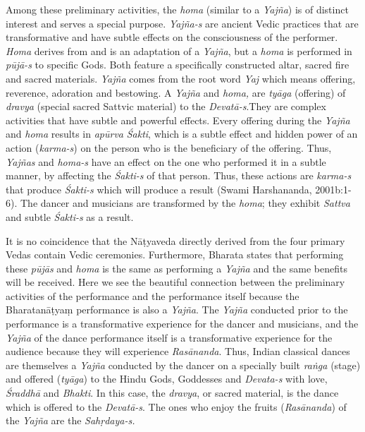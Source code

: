  Among these preliminary activities, the \textit{homa} (similar to a \textit{Yajña}) is of distinct interest and serves a special purpose. \textit{Yajña-s} are ancient Vedic practices that are transformative and have subtle effects on the consciousness of the performer. \textit{Homa} derives from and is an adaptation of a \textit{Yajña}, but a \textit{homa} is performed in \textit{pūjā-s }to specific Gods. Both feature a specifically constructed altar, sacred fire and sacred materials. \textit{Yajña} comes from the root word \textit{Yaj} which means offering, reverence, adoration and bestowing. A \textit{Yajña} and \textit{homa,} are \textit{tyāga }(offering) of \textit{dravya} (special sacred Sattvic material) to the \textit{Devatā-s}.\break They are complex activities that have subtle and powerful effects. Every offering during the \textit{Yajña} and \textit{homa} results in \textit{apūrva} \textit{Śakti}, which is a subtle effect and hidden power of an action (\textit{karma-s}) on the person who is the beneficiary of the offering. Thus, \textit{Yajñas} and \textit{homa-s} have an effect on the one who performed it in a subtle manner, by affecting the \textit{Śakti-s }of that person. Thus, these actions are \textit{karma-s} that produce \textit{Śakti-s} which will produce a result (Swami Harshananda, 2001b:1-6). The dancer and musicians are transformed by the \textit{homa}; they exhibit \textit{Sattva} and subtle \textit{Śakti-s} as a result.

It is no coincidence that the Nāṭyaveda directly derived from the four primary Vedas contain Vedic ceremonies. Furthermore, Bharata states that performing these \textit{pūjās} and \textit{homa} is the same as performing a \textit{Yajña} and the same benefits will be received. Here we see the beautiful connection between the preliminary activities of the performance and the performance itself because the Bharatanāṭyaṃ performance is also a \textit{Yajña}. The \textit{Yajña} conducted prior to the performance is a transformative experience for the dancer and musicians, and the \textit{Yajña} of the dance performance itself is a transformative experience for the audience because they will experience \textit{Rasānanda}. Thus, Indian classical dances are themselves a \textit{Yajña} conducted by the dancer on a specially built \textit{raṅga} (stage) and offered (\textit{tyāga}) to the Hindu Gods, Goddesses and \textit{Devata-s} with love, \textit{Śraddhā }and \textit{Bhakti}. In this case, the \textit{dravya}, or sacred material, is the dance which is offered to the \textit{Devatā-s}. The ones who enjoy the fruits (\textit{Rasānanda}) of the \textit{Yajña} are the \textit{Sahṛdaya-s.}

